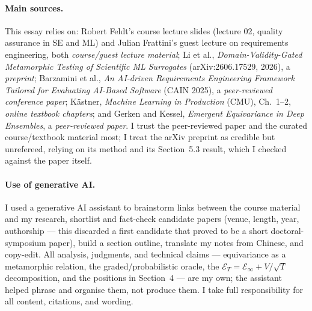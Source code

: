 \documentclass[11pt, a4paper]{article}
\begin{document}
\paragraph{Main sources.} This essay relies on: Robert Feldt's course lecture slides (lecture 02, quality assurance in SE and ML) and Julian Frattini's guest lecture on requirements engineering, both \emph{course/guest lecture material}; Li et al., \emph{Domain-Validity-Gated Metamorphic Testing of Scientific ML Surrogates} (arXiv:2606.17529, 2026), a \emph{preprint}; Barzamini et al., \emph{An AI-driven Requirements Engineering Framework Tailored for Evaluating AI-Based Software} (CAIN 2025), a \emph{peer-reviewed conference paper}; Kästner, \emph{Machine Learning in Production} (CMU), Ch.\ 1–2, \emph{online textbook chapters}; and Gerken and Kessel, \emph{Emergent Equivariance in Deep Ensembles}, a \emph{peer-reviewed paper}. I trust the peer-reviewed paper and the curated course/textbook material most; I treat the arXiv preprint as credible but unrefereed, relying on its method and its Section~5.3 result, which I checked against the paper itself.

\paragraph{Use of generative AI.} I used a generative AI assistant to brainstorm links between the course material and my research, shortlist and fact-check candidate papers (venue, length, year, authorship — this discarded a first candidate that proved to be a short doctoral-symposium paper), build a section outline, translate my notes from Chinese, and copy-edit. All analysis, judgments, and technical claims — equivariance as a metamorphic relation, the graded/probabilistic oracle, the $\mathcal{E}_T = \mathcal{E}_\infty + V/\sqrt{T}$ decomposition, and the positions in Section~4 — are my own; the assistant helped phrase and organise them, not produce them. I take full responsibility for all content, citations, and wording.

\printbibliography
\end{document}
